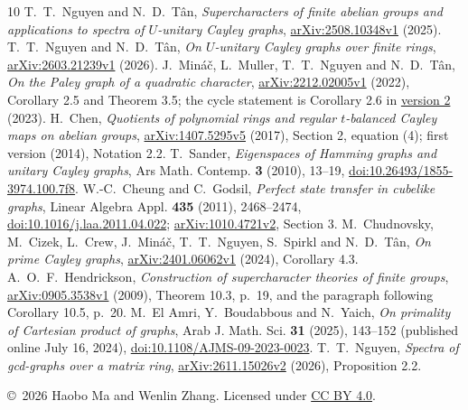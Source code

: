 \documentclass[10pt]{article}
\begin{document}
\begin{thebibliography}{10}
\small
\setlength{\itemsep}{2pt}
 T.~T.~Nguyen and N.~D.~T\^an,
\emph{Supercharacters of finite abelian groups and applications to spectra
of $U$-unitary Cayley graphs},
\href{https://arxiv.org/abs/2508.10348v1}{arXiv:2508.10348v1} (2025).
 T.~T.~Nguyen and N.~D.~T\^an,
\emph{On $U$-unitary Cayley graphs over finite rings},
\href{https://arxiv.org/abs/2603.21239v1}{arXiv:2603.21239v1} (2026).
 J.~Min\'a\v{c}, L.~Muller, T.~T.~Nguyen and N.~D.~T\^an,
\emph{On the Paley graph of a quadratic character},
\href{https://arxiv.org/abs/2212.02005v1}{arXiv:2212.02005v1} (2022),
Corollary 2.5 and Theorem 3.5; the cycle statement is Corollary 2.6 in
\href{https://arxiv.org/abs/2212.02005v2}{version 2} (2023).
 H.~Chen,
\emph{Quotients of polynomial rings and regular $t$-balanced Cayley maps
on abelian groups},
\href{https://arxiv.org/abs/1407.5295v5}{arXiv:1407.5295v5} (2017),
Section 2, equation (4); first version (2014), Notation 2.2.
 T.~Sander,
\emph{Eigenspaces of Hamming graphs and unitary Cayley graphs},
Ars Math. Contemp. \textbf{3} (2010), 13--19,
\href{https://doi.org/10.26493/1855-3974.100.7f8}{doi:10.26493/1855-3974.100.7f8}.
 W.-C.~Cheung and C.~Godsil,
\emph{Perfect state transfer in cubelike graphs},
Linear Algebra Appl. \textbf{435} (2011), 2468--2474,
\href{https://doi.org/10.1016/j.laa.2011.04.022}{doi:10.1016/j.laa.2011.04.022};
\href{https://arxiv.org/abs/1010.4721v2}{arXiv:1010.4721v2}, Section 3.
 M.~Chudnovsky, M.~Cizek, L.~Crew, J.~Min\'a\v{c},
T.~T.~Nguyen, S.~Spirkl and N.~D.~T\^an,
\emph{On prime Cayley graphs},
\href{https://arxiv.org/abs/2401.06062v1}{arXiv:2401.06062v1} (2024),
Corollary 4.3.
 A.~O.~F.~Hendrickson,
\emph{Construction of supercharacter theories of finite groups},
\href{https://arxiv.org/abs/0905.3538v1}{arXiv:0905.3538v1} (2009),
Theorem 10.3, p.~19, and the paragraph following Corollary 10.5, p.~20.
 M.~El Amri, Y.~Boudabbous and N.~Yaich,
\emph{On primality of Cartesian product of graphs},
Arab J. Math. Sci. \textbf{31} (2025), 143--152
(published online July 16, 2024),
\href{https://doi.org/10.1108/AJMS-09-2023-0023}{doi:10.1108/AJMS-09-2023-0023}.
 T.~T.~Nguyen,
\emph{Spectra of gcd-graphs over a matrix ring},
\href{https://arxiv.org/abs/2611.15026v2}{arXiv:2611.15026v2} (2026),
Proposition 2.2.
\end{thebibliography}
\medskip\noindent\small
\copyright\ 2026 Haobo Ma and Wenlin Zhang.
Licensed under \href{https://creativecommons.org/licenses/by/4.0/}{CC BY 4.0}.
\end{document}
